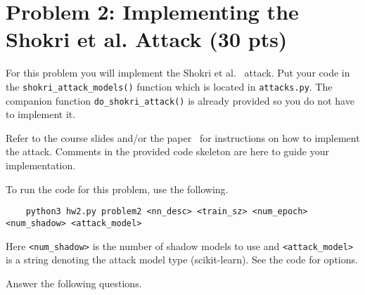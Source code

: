 \newpage
\section*{Problem 2: Implementing the Shokri et al. Attack (30 pts)}
%

For this problem you will implement the Shokri et al.~\cite{shokri2017membership} attack. Put your code in the \texttt{shokri\_attack\_models()} function which is located in \texttt{attacks.py}. The companion function \texttt{do\_shokri\_attack()} is already provided so you do not have to implement it. 

Refer to the course slides and/or the paper~\cite{shokri2017membership} for instructions on how to implement the attack. Comments in the provided code skeleton are here to guide your implementation.

To run the code for this problem, use the following.
%
\begin{Verbatim}
	python3 hw2.py problem2 <nn_desc> <train_sz> <num_epoch> <num_shadow> <attack_model>
\end{Verbatim}
%
Here \texttt{<num\_shadow>} is the number of shadow models to use and \texttt{<attack\_model>} is a string denoting the attack model type (scikit-learn). See the code for options.


\bigskip
\noindent Answer the following questions.


